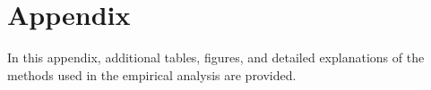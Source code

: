 \section*{Appendix}
In this appendix, additional tables, figures, and detailed explanations of the methods used in the empirical analysis are provided.
